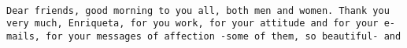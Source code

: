 \documentclass[
]{article}
\begin{document}
\begin{verbatim}
                                                                                                                                                                                                                                                                                                                                                                                                                                                                                                                                                                                                                                                                                                                                                                                                                                                                                                                                                                                                                                                                                                                                                                                                                                                                                                                                                                                                                                                                                                                                                                                                                                                                                                                                                                                                                                                                                                                                                                                                                                                                                                                                                                                                                                                                                                                                                                                                                                                                                                                                                                                                                                                                                                                                                                                                                                                                                                                                                                                                                                                                                                                                                                                                                                     Dear friends, good morning to you all, both men and women. Thank you very much, Enriqueta, for you work, for your attitude and for your e-mails, for your messages of affection -some of them, so beautiful- and 
\end{verbatim}
\end{document}
